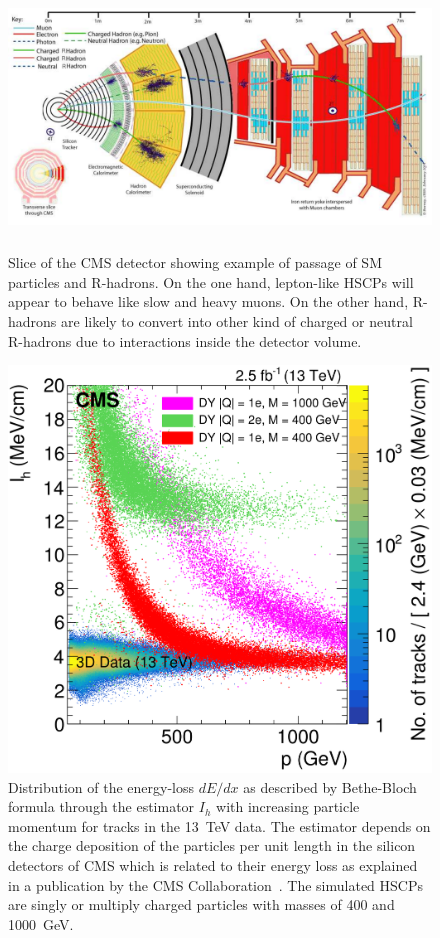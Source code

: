 \endgroup

	\begin{figure}[H]
		\centering
		\includegraphics[height=7cm]{fig/chapt3/CMS-slice-HSCPs.png}
		\caption{\label{fig:HSCPs} Slice of the CMS detector showing example of passage of SM particles and R-hadrons. On the one hand, lepton-like HSCPs will appear to behave like slow and heavy muons. On the other hand, R-hadrons are likely to convert into other kind of charged or neutral R-hadrons due to interactions inside the detector volume.}
	\end{figure}
	
\begingroup\setlength{\intextsep}{5pt}\setlength{\columnsep}{15pt}
	
	\begin{figure}
		\centering
		\includegraphics[width=\linewidth]{fig/chapt3/HSCPs_dEdx_CMS.png}
		\caption{\label{fig:dEdx-HSCPs} Distribution of the energy-loss $dE/dx$ as described by Bethe-Bloch formula through the estimator $I_h$ with increasing particle momentum for tracks in the \SI{13}{TeV} data. The estimator depends on the charge deposition of the particles per unit length in the silicon detectors of CMS which is related to their energy loss as explained in a publication by the CMS Collaboration~\cite{CMSHSCP2016}. The simulated HSCPs are singly or multiply charged particles with masses of 400 and \SI{1000}{GeV}.}
	\end{figure}
	
